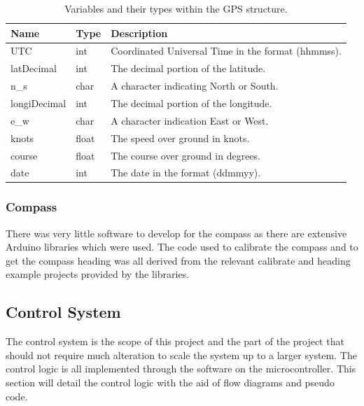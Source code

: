 	\begin{table}[!ht]
		\begin{center}
			\caption{Variables and their types within the GPS structure.}
			\label{tab:3:GPSstruct}
			\begin{tabular}{|l|l|l|}
				\hline
				\textbf{Name} & \textbf{Type} & \textbf{Description} \\
				\hline
				UTC & int & Coordinated Universal Time in the format (hhmmss). \\
				\hline
				latDecimal & int & The decimal portion of the latitude. \\
				\hline
				n\_s & char & A character indicating North or South. \\
				\hline 
				longiDecimal & int & The decimal portion of the longitude. \\
				\hline 
				e\_w & char & A character indication East or West. \\
				\hline
				knots & float & The speed over ground in knots. \\
				\hline
				course & float & The course over ground in degrees. \\
				\hline
				date & int & The date in the format (ddmmyy). \\
				\hline
			\end{tabular}
		\end{center}
	\end{table}
	\subsubsection{Compass}
	There was very little software to develop for the compass as there are extensive Arduino libraries which were used. The code used to calibrate the compass and to get the compass heading was all derived from the relevant calibrate and heading example projects provided by the libraries. 
	\subsection{Control System}
	The control system is the scope of this project and the part of the project that should not require much alteration to scale the system up to a larger system. The control logic  is all implemented through the software on the microcontroller. This section will detail the control logic with the aid of flow diagrams and pseudo code. 

